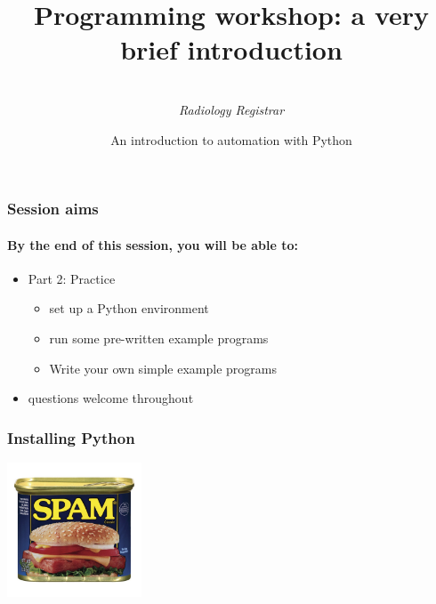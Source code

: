 \documentclass{beamer}
\title[Programming workshop]{Programming workshop: a very brief introduction}
\author{
	\sc{Mark Thurston}\\
    \textit{Radiology Registrar}
}
\institute{
	\textit{Peninsula Radiology Academy}\\
    \textit{Plymouth}
}
\date[April 2018]{An introduction to automation with Python} %
\begin{document}
    \begin{frame}[plain]
	    \titlepage
    \end{frame}


    \begin{frame}
	    \frametitle{Session aims}
	    \framesubtitle{By the end of this session, you will be able to:}

	    \begin{itemize}
		    \item Part 2: Practice
			    \begin{itemize}
				    \item set up a Python environment
				    \item run some pre-written example programs
				    \item Write your own simple example programs
			    \end{itemize}
	    \end{itemize}
	    \begin{itemize}
		    \item questions welcome throughout
	    \end{itemize}
    \end{frame}

    \begin{frame}
	    \frametitle{Installing Python}

	    \begin{center}
	    \includegraphics[height=4cm]{images/spam.jpg}
	    \end{center}
    \end{frame}
\end{document}
